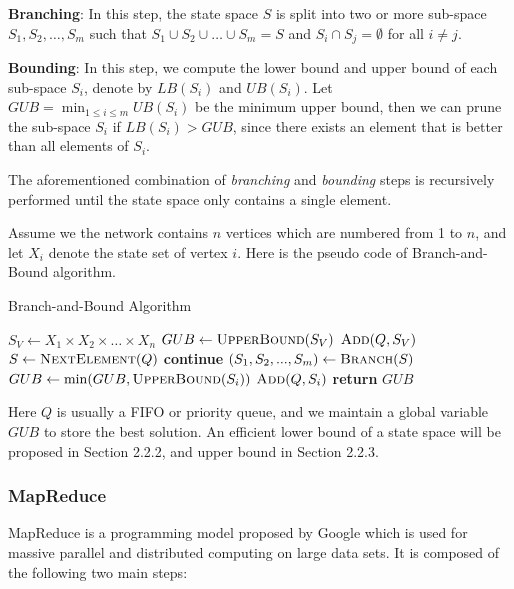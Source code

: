 \noindent \textbf{Branching}: In this step, the state space $S$ is split into two or more sub-space $S_1,S_2,\dots,S_m$ such that $S_1\cup S_2\cup\dots\cup S_m=S$ and $S_i\cap S_j=\emptyset$ for all $i\neq j$.

\noindent \textbf{Bounding}: In this step, we compute the lower bound and upper bound of each sub-space $S_i$, denote by $LB(S_i)$ and $UB(S_i)$. Let $GUB=\min_{1\le i\le m}UB(S_i)$ be the minimum upper bound, then we can prune the sub-space $S_i$ if $LB(S_i)>GUB$, since there exists an element that is better than all elements of $S_i$.

The aforementioned combination of \textit{branching} and \textit{bounding} steps is recursively performed until the state space only contains a single element.

Assume we the network contains $n$ vertices which are numbered from 1 to $n$, and let $X_i$ denote the state set of vertex $i$. Here is the pseudo code of Branch-and-Bound algorithm.

\begin{algorithm}[!h]
\caption{Branch-and-Bound Algorithm}
\begin{algorithmic}[1]
    \State $S_V \gets X_1\times X_2\times\dots\times X_n$
    \State $GUB \gets \textsc{UpperBound}(S_V)$
    \State $\textsc{Add}(Q, S_V)$
        \State $S \gets \textsc{NextElement}(Q)$
            \State \textbf{continue}
        \EndIf
        \State $(S_1,S_2,...,S_m) \gets \textsc{Branch}(S)$
            \State $GUB \gets \min(GUB, \textsc{UpperBound}(S_i))$
        \EndFor
                \State $\textsc{Add}(Q, S_i)$
            \EndIf
        \EndFor
    \EndWhile
    \State \textbf{return }$GUB$
\EndFunction
\end{algorithmic}
\end{algorithm}

Here $Q$ is usually a FIFO or priority queue, and we maintain a global variable $GUB$ to store the best solution. An efficient lower bound of a state space will be proposed in Section 2.2.2, and upper bound in Section 2.2.3.

\subsubsection{MapReduce}
MapReduce is a programming model proposed by Google which is used for massive parallel and distributed computing on large data sets. It is composed of the following two main steps:

